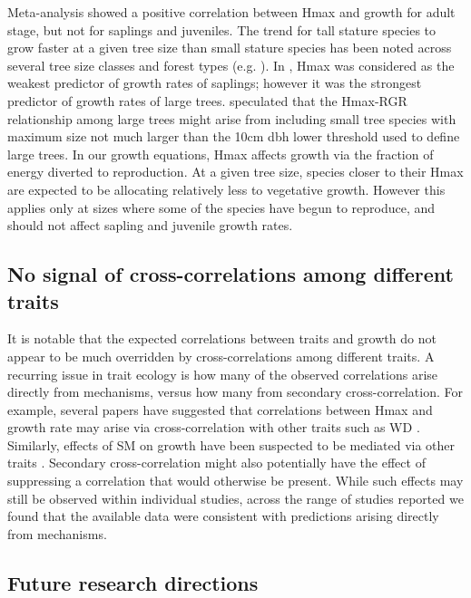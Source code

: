 \documentclass[a4paper]{article}\usepackage[]{graphicx}\usepackage[]{color}
\begin{document}
Meta-analysis showed a positive correlation between Hmax and growth for adult stage, but not for saplings and juveniles. The trend for tall stature species to grow faster at a given tree size than small stature species has been noted across several tree size classes and forest types (e.g. \citealt{Poorter:2008iu,Wright:2010tp,Herault:2011dd,Ruger:2012jv,Iida:2014ep}). In \citet{Wright:2010tp}, Hmax was considered as the weakest predictor of growth rates of saplings; however it was the strongest predictor of growth rates of large trees. \citet{Poorter:2008iu} speculated that the Hmax-RGR relationship among large trees might arise from including small tree species with maximum size not much larger than the  10cm dbh lower threshold used to define large trees. In our growth equations, Hmax affects growth via the fraction of energy diverted to reproduction. At a given tree size, species closer to their Hmax are expected to be allocating relatively less to vegetative growth. However this applies only at sizes where some of the species have begun to reproduce, and should not affect sapling and juvenile growth rates. 

\subsection*{No signal of cross-correlations among different traits}

It is notable that the expected correlations between traits and growth do not appear to be much overridden by cross-correlations among different traits. A recurring issue in trait ecology is how many of the observed correlations arise directly from mechanisms, versus how many from secondary cross-correlation. For example, several papers have suggested that correlations between Hmax and growth rate may arise via cross-correlation with other traits such as WD \citep{Thomas:1996do, Poorter:2006vb, Wright:2010tp}. Similarly, effects of SM on growth have been suspected to be mediated via other traits \citep{Shipley:1990js,Westoby:2002ft,Poorter:2006vb}. Secondary cross-correlation might also potentially have the effect of suppressing a correlation that would otherwise be present. While such effects may still be observed within individual studies, across the range of studies reported we found that the available data were consistent with predictions arising directly from mechanisms. 

\subsection*{Future research directions}
\end{document}
